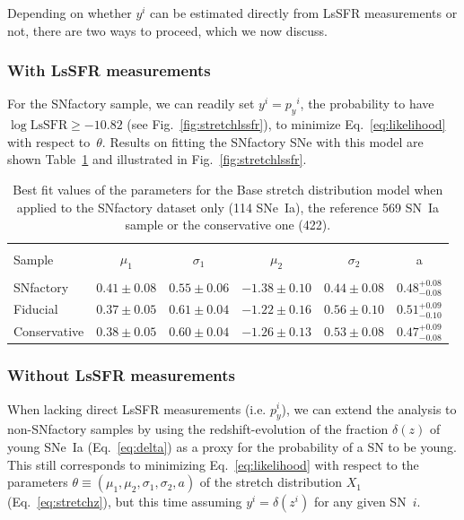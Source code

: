 \documentclass[]{aa} %
\begin{document}
Depending on whether $y^i$ can be estimated directly from LsSFR measurements or
not, there are two ways to proceed, which we now discuss.

\subsubsection{With LsSFR measurements}\label{sec:modelpy}

For the SNfactory sample, we can readily set $y^i = p_y{}^i$, the probability to
have $\log \mathrm{LsSFR} \geq -10.82$ (see Fig.~\ref{fig:stretchlssfr}), to
minimize Eq.~\ref{eq:likelihood} with respect to~$\theta$.  Results on fitting
the SNfactory SNe with this model are shown Table~\ref{tab:modelresults} and
illustrated in Fig.~\ref{fig:stretchlssfr}.

\begin{table}
    \centering
    \caption{Best fit values of the parameters for the Base stretch distribution
    model when applied to the SNfactory dataset only (114 SNe~Ia), the reference 569
SN~Ia sample or the conservative one (422).}
    \label{tab:modelresults}
    \begin{tabular}{l c c c c c}
    \hline\hline\\[-0.8em]
        Sample & $\mu_1$  & $\sigma_1$ &$\mu_2$  & $\sigma_2$ & a \\[0.15em]
        \hline\\[-0.8em]
        SNfactory & $0.41 \pm 0.08$  & $0.55 \pm 0.06$ & $-1.38 \pm 0.10$ & $0.44 \pm 0.08$ & $0.48^{+0.08}_{-0.08}$ \\[0.15em]
        Fiducial & $0.37 \pm 0.05$  & $0.61 \pm 0.04$ & $-1.22 \pm 0.16$ & $0.56 \pm 0.10$ & $0.51^{+0.09}_{-0.10}$ \\[0.15em]
        Conservative & $0.38 \pm 0.05$  & $0.60 \pm 0.04$ & $-1.26 \pm 0.13$ & $0.53 \pm 0.08$ & $0.47^{+0.09}_{-0.08}$ \\[0.15em]
        \hline
    \end{tabular}
\end{table}

\subsubsection{Without LsSFR measurements}\label{sec:modelnopy}

When lacking direct LsSFR measurements (i.e. $p_y^i$), we can extend the
analysis to non-SNfactory samples by using the redshift-evolution of the
fraction $\delta(z)$ of young SNe~Ia (Eq.~\ref{eq:delta}) as a proxy for the
probability of a SN to be young. This still corresponds to minimizing
Eq.~\ref{eq:likelihood} with respect to the parameters $\theta\equiv(\mu_1,
\mu_2, \sigma_1, \sigma_2, a)$ of the stretch distribution $X_1$
(Eq.~\ref{eq:stretchz}), but this time assuming $y^i = \delta(z^i)$ for any
given SN~$i$. 
\end{document}
